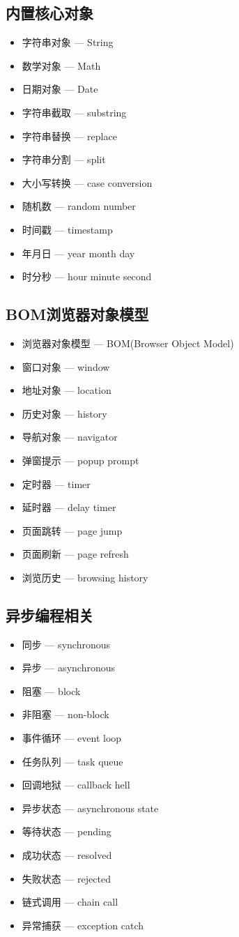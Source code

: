 \subsection{内置核心对象}
\begin{itemize}
\item 字符串对象 — String
\item 数学对象 — Math
\item 日期对象 — Date
\item 字符串截取 — substring
\item 字符串替换 — replace
\item 字符串分割 — split
\item 大小写转换 — case conversion
\item 随机数 — random number
\item 时间戳 — timestamp
\item 年月日 — year month day
\item 时分秒 — hour minute second
\end{itemize}

\subsection{BOM浏览器对象模型}
\begin{itemize}
\item 浏览器对象模型 — BOM(Browser Object Model)
\item 窗口对象 — window
\item 地址对象 — location
\item 历史对象 — history
\item 导航对象 — navigator
\item 弹窗提示 — popup prompt
\item 定时器 — timer
\item 延时器 — delay timer
\item 页面跳转 — page jump
\item 页面刷新 — page refresh
\item 浏览历史 — browsing history
\end{itemize}

\subsection{异步编程相关}
\begin{itemize}
\item 同步 — synchronous
\item 异步 — asynchronous
\item 阻塞 — block
\item 非阻塞 — non-block
\item 事件循环 — event loop
\item 任务队列 — task queue
\item 回调地狱 — callback hell
\item 异步状态 — asynchronous state
\item 等待状态 — pending
\item 成功状态 — resolved
\item 失败状态 — rejected
\item 链式调用 — chain call
\item 异常捕获 — exception catch
\end{itemize}


